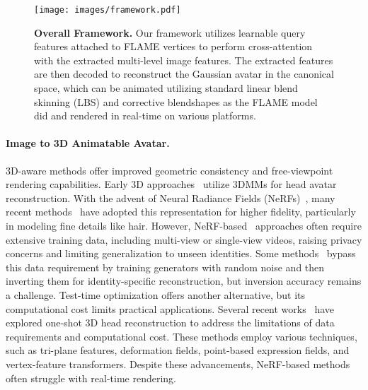 \begin{figure*}[h]
    \centering
    \texttt{[image: images/framework.pdf]}
    \caption{\textbf{Overall Framework.} Our framework utilizes learnable query features attached to FLAME vertices to perform cross-attention with the extracted multi-level image features. The extracted features are then decoded to reconstruct the Gaussian avatar in the canonical space, which can be animated utilizing standard linear blend skinning (LBS) and corrective blendshapes as the FLAME model did and rendered in real-time on various platforms.}
    \label{fig:framework}
\end{figure*}

\paragraph{\bf Image to 3D Animatable Avatar.}
3D-aware methods offer improved geometric consistency and free-viewpoint rendering capabilities. Early 3D approaches~\cite{DBLP:conf/eccv/KhakhulinSLZ22,DBLP:conf/cvpr/XuYCWDJT20} utilize 3DMMs for head avatar reconstruction. With the advent of Neural Radiance Fields (NeRFs)~\cite{DBLP:conf/eccv/MildenhallSTBRN20}, many recent methods~\cite{DBLP:conf/siggraph/YuFZWYBCSWSW23,DBLP:conf/cvpr/MaZQLZ23,DBLP:conf/cvpr/LiZWZ0CZWB023,GPAvatar,ye2024real3d,deng2024portrait4d,deng2024portrait4d2,DBLP:conf/eccv/KiMC24,DBLP:conf/cvpr/BaiFWZSYS23,PointAvatar,Nerfies,INSTA} have adopted this representation for higher fidelity, particularly in modeling fine details like hair. However, NeRF-based~\cite{DBLP:conf/cvpr/ZhangZLHLWGCL024,HAvatar,DBLP:conf/cvpr/BaiTHSTQMDDOPTB23,AD-NeRF,DBLP:journals/tog/GaoZXHGZ22,DBLP:journals/tog/ParkSHBBGMS21,DBLP:conf/cvpr/AtharXSSS22,DBLP:journals/corr/abs-2112-05637,DBLP:conf/iccv/TretschkTGZLT21,DBLP:conf/cvpr/GafniTZN21,DBLP:conf/eccv/KiMC24,DBLP:conf/cvpr/BaiFWZSYS23,PointAvatar,Nerfies,DBLP:conf/siggraph/YuFZWYBCSWSW23,DBLP:conf/cvpr/MaZQLZ23,DBLP:conf/cvpr/LiZWZ0CZWB023} approaches often require extensive training data, including multi-view or single-view videos, raising privacy concerns and limiting generalization to unseen identities. Some methods~\cite{DBLP:conf/cvpr/SunWWLZZL23,DBLP:conf/3dim/ZhuangMKS22,DBLP:journals/pami/SunWZHWL24,DBLP:journals/tvcg/TangZYZCMW24,DBLP:conf/iclr/XuZLZBFS23} bypass this data requirement by training generators with random noise and then inverting them for identity-specific reconstruction, but inversion accuracy remains a challenge. Test-time optimization offers another alternative, but its computational cost limits practical applications. Several recent works~\cite{goha2023,hidenerf2023,gpavatar2024,ye2024real3d,ma2024cvthead,deng2024portrait4d,deng2024portrait4d2,GGHead} have explored one-shot 3D head reconstruction to address the limitations of data requirements and computational cost. These methods employ various techniques, such as tri-plane features, deformation fields, point-based expression fields, and vertex-feature transformers. Despite these advancements, NeRF-based methods often struggle with real-time rendering. 
